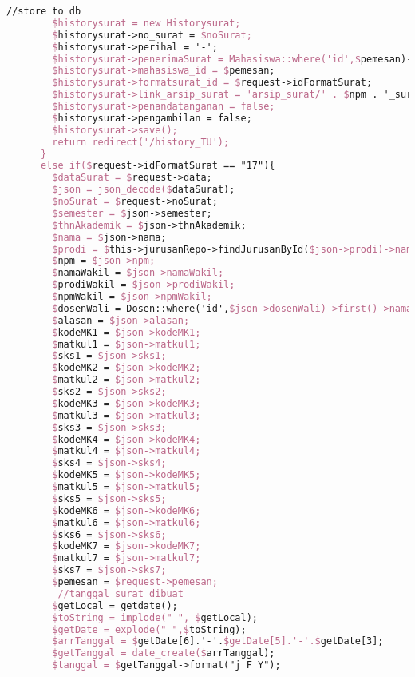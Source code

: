 \begin{lstlisting}[language=tex,basicstyle=\tiny,caption=HistorysuratController.php]
        //store to db
        $historysurat = new Historysurat;
        $historysurat->no_surat = $noSurat;
        $historysurat->perihal = '-';
        $historysurat->penerimaSurat = Mahasiswa::where('id',$pemesan)->first()->dosen->nama_dosen;
        $historysurat->mahasiswa_id = $pemesan;
        $historysurat->formatsurat_id = $request->idFormatSurat;
        $historysurat->link_arsip_surat = 'arsip_surat/' . $npm . '_surat_perwakilan_perwalian_6mk.pdf';
        $historysurat->penandatanganan = false;
        $historysurat->pengambilan = false;
        $historysurat->save();
        return redirect('/history_TU');
      }
      else if($request->idFormatSurat == "17"){
        $dataSurat = $request->data;
        $json = json_decode($dataSurat);
        $noSurat = $request->noSurat;
        $semester = $json->semester;
        $thnAkademik = $json->thnAkademik;
        $nama = $json->nama;
        $prodi = $this->jurusanRepo->findJurusanById($json->prodi)->nama_jurusan;
        $npm = $json->npm;
        $namaWakil = $json->namaWakil;
        $prodiWakil = $json->prodiWakil;
        $npmWakil = $json->npmWakil;
        $dosenWali = Dosen::where('id',$json->dosenWali)->first()->nama_dosen;
        $alasan = $json->alasan;
        $kodeMK1 = $json->kodeMK1;
        $matkul1 = $json->matkul1;
        $sks1 = $json->sks1;
        $kodeMK2 = $json->kodeMK2;
        $matkul2 = $json->matkul2;
        $sks2 = $json->sks2;
        $kodeMK3 = $json->kodeMK3;
        $matkul3 = $json->matkul3;
        $sks3 = $json->sks3;
        $kodeMK4 = $json->kodeMK4;
        $matkul4 = $json->matkul4;
        $sks4 = $json->sks4;
        $kodeMK5 = $json->kodeMK5;
        $matkul5 = $json->matkul5;
        $sks5 = $json->sks5;
        $kodeMK6 = $json->kodeMK6;
        $matkul6 = $json->matkul6;
        $sks6 = $json->sks6;
        $kodeMK7 = $json->kodeMK7;
        $matkul7 = $json->matkul7;
        $sks7 = $json->sks7;
        $pemesan = $request->pemesan;
         //tanggal surat dibuat
        $getLocal = getdate();
        $toString = implode(" ", $getLocal);
        $getDate = explode(" ",$toString);
        $arrTanggal = $getDate[6].'-'.$getDate[5].'-'.$getDate[3];
        $getTanggal = date_create($arrTanggal);
        $tanggal = $getTanggal->format("j F Y");


\end{lstlisting}

